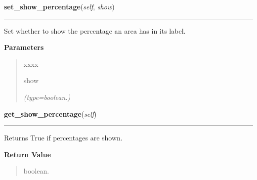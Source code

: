     \label{pygtk_chart:pie_chart:PieChart:set_show_percentage}

    \vspace{0.5ex}

\hspace{.8\funcindent}\begin{boxedminipage}{\funcwidth}

    \raggedright \textbf{set\_show\_percentage}(\textit{self}, \textit{show})

    \vspace{-1.5ex}

    \rule{\textwidth}{0.5\fboxrule}
\setlength{\parskip}{2ex}
    Set whether to show the percentage an area has in its label.

\setlength{\parskip}{1ex}
      \textbf{Parameters}
      \vspace{-1ex}

      \begin{quote}
        \begin{Ventry}{xxxx}

          \item[show]

            {\it (type=boolean.)}

        \end{Ventry}

      \end{quote}

    \end{boxedminipage}

    \label{pygtk_chart:pie_chart:PieChart:get_show_percentage}

    \vspace{0.5ex}

\hspace{.8\funcindent}\begin{boxedminipage}{\funcwidth}

    \raggedright \textbf{get\_show\_percentage}(\textit{self})

    \vspace{-1.5ex}

    \rule{\textwidth}{0.5\fboxrule}
\setlength{\parskip}{2ex}
    Returns True if percentages are shown.

\setlength{\parskip}{1ex}
      \textbf{Return Value}
    \vspace{-1ex}

      \begin{quote}
      boolean.

      \end{quote}

    \end{boxedminipage}

